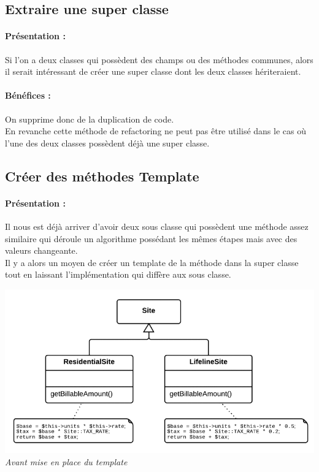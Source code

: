 \documentclass[a4paper,twoside,12pt,openright]{report}
\begin{document}
\subsection{Extraire une super classe}
\paragraph{Présentation :}
Si l'on a deux classes qui possèdent des champs ou des méthodes communes, alors il serait intéressant de créer une super classe dont les deux classes hériteraient.\\

\paragraph{Bénéfices :}
On supprime donc de la duplication de code.\\
En revanche cette méthode de refactoring ne peut pas être utilisé dans le cas où l'une des deux classes possèdent déjà une super classe.\\

\subsection{Créer des méthodes Template}
\paragraph{Présentation :}
Il nous est déjà arriver d'avoir deux sous classe qui possèdent une méthode assez similaire qui déroule un algorithme possédant les mêmes étapes mais avec des valeurs changeante.\\
Il y a alors un moyen de créer un template de la méthode dans la super classe tout en laissant l'implémentation qui diffère aux sous classe.\\

\begin{center}
\includegraphics[scale=0.75]{Image/Template.png}\\
\itshape{Avant mise en place du template \cite{ref5}}
\end{center}
\end{document}
